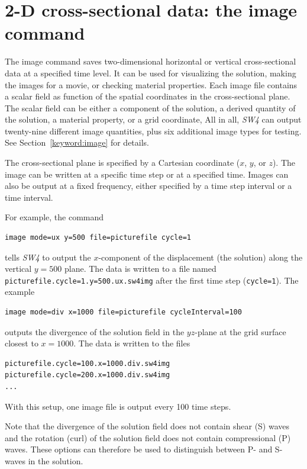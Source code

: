 \documentclass[11pt]{report}
\begin{document}
\section{2-D cross-sectional data: the image command}
The image command saves two-dimensional horizontal or vertical cross-sectional data at a specified
time level. It can be used for visualizing the solution, making the images for a movie, or checking
material properties. Each image file contains a scalar field as function of the spatial coordinates
in the cross-sectional plane. The scalar field can be either a component of the solution, a derived
quantity of the solution, a material property, or a grid coordinate, All in all, \emph{SW4} can
output twenty-nine different image quantities, plus six additional image types for testing. See
Section~\ref{keyword:image} for details.

The cross-sectional plane is specified by a Cartesian coordinate ($x$, $y$, or $z$). The image can
be written at a specific time step or at a specified time. Images can also be output at a fixed
frequency, either specified by a time step interval or a time interval.

For example, the command
\begin{verbatim}
image mode=ux y=500 file=picturefile cycle=1
\end{verbatim}
tells \emph{SW4} to output the $x$-component of the displacement (the solution) along the vertical
$y=500$ plane.  The data is written to a file named {\tt picturefile.cycle=1.y=500.ux.sw4img} after
the first time step ({\tt cycle=1}). The example
\begin{verbatim}
image mode=div x=1000 file=picturefile cycleInterval=100
\end{verbatim}
outputs the divergence of the solution field in the $yz$-plane at the grid surface closest to
$x=1000$. The data is written to the files
\begin{verbatim} 
picturefile.cycle=100.x=1000.div.sw4img
picturefile.cycle=200.x=1000.div.sw4img
...
\end{verbatim}
With this setup, one image file is output every 100 time steps.

Note that the divergence of the solution field does not contain shear (S) waves and the
rotation (curl) of the solution field does not contain compressional (P) waves. These
options can therefore be used to distinguish between P- and S-waves in the solution.
\end{document}
